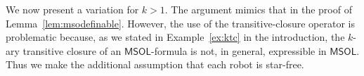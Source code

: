 \documentclass{llncs}
\newtheorem{lemma}{Lemma}
\def\nat{\mathbb{N}}
\newcommand{\tup}[1]{\overline{#1}}
\newcommand{\tpl}[1]{\left<{#1}\right>}
\def\msol{\mathsf{MSOL}}
\begin{document}
%

\iffalse
We now present a variation for $k > 1$. The argument mimics that in the proof of Lemma~\ref{lem:msodefinable}. However, the use of the transitive-closure operator is problematic because, as we stated in Example~\ref{ex:ktc} in the introduction, the $k$-ary transitive closure of an $\msol$-formula is not, in general, expressible in $\msol$.
Thus we make the additional assumption that each robot is star-free.
\end{document}
